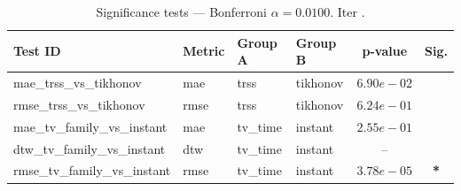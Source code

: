 ﻿%
\begin{table}[ht]
\centering
\caption[EEG reconstruction - Iteration it22b]{Significance tests — Bonferroni $\alpha=0.0100$. Iter .}
\label{tab:sig_it22b_knn_k3_3syn}
\small
\begin{tabular}{llllcc}
\toprule
Test ID & Metric & Group A & Group B & p-value & Sig. \\
\midrule
mae\_trss\_vs\_tikhonov & mae & trss & tikhonov & $6.90e-02$ &  \\
rmse\_trss\_vs\_tikhonov & rmse & trss & tikhonov & $6.24e-01$ &  \\
mae\_tv\_family\_vs\_instant & mae & tv\_time & instant & $2.55e-01$ &  \\
dtw\_tv\_family\_vs\_instant & dtw & tv\_time & instant & -- &  \\
rmse\_tv\_family\_vs\_instant & rmse & tv\_time & instant & $3.78e-05$ & \textbf{*} \\
\bottomrule
\end{tabular}
\end{table}








